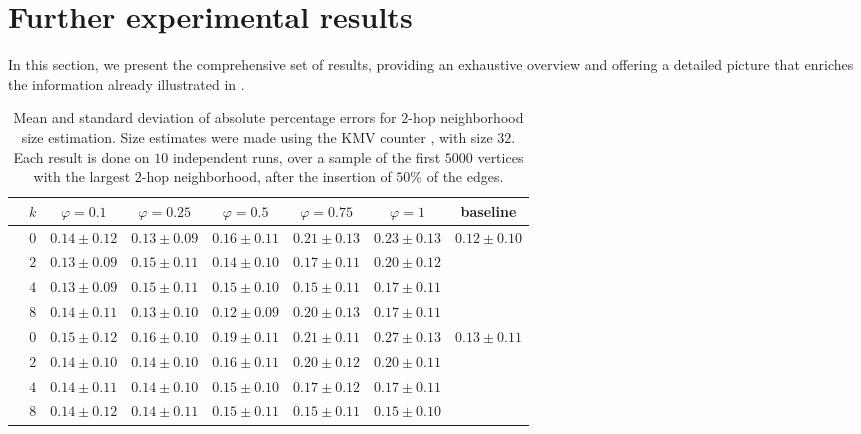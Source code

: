 \section{Further experimental results}\label{apx:experiments}

In this section, we present the comprehensive set of results, providing an exhaustive overview and offering a detailed picture that enriches the information already illustrated in .

\begin{table*}[ht]
    \centering
    \caption{Mean and standard deviation of absolute percentage errors for $2$-hop neighborhood size estimation. Size estimates were made using the KMV counter \cite{trevisan/646978.711822}, with size $32$.
    Each result is done on $10$ independent runs, over a sample of the first $5000$ vertices with the largest $2$-hop neighborhood, after the insertion of $50\%$ of the edges.
    }
    \begin{tabular}{lc|ccccc|c}
    \toprule
        & $k$ & $\varphi = 0.1$ & $\varphi = 0.25$ & $\varphi = 0.5$ & $\varphi = 0.75$ & $\varphi = 1$ & baseline\\
    \midrule

    \parbox[t]{2mm}{}

    & $0$ & $0.14 \pm 0.12$ & $0.13 \pm 0.09$ & $0.16 \pm 0.11$ & $0.21 \pm 0.13$ & $0.23 \pm 0.13$ &  \\
    & $2$ & $0.13 \pm 0.09$ & $0.15 \pm 0.11$ & $0.14 \pm 0.10$ & $0.17 \pm 0.11$ & $0.20 \pm 0.12$ & \\
    & $4$ & $0.13 \pm 0.09$ & $0.15 \pm 0.11$ & $0.15 \pm 0.10$ & $0.15 \pm 0.11$ & $0.17 \pm 0.11$ & \\
    & $8$ & $0.14 \pm 0.11$ & $0.13 \pm 0.10$ & $0.12 \pm 0.09$ & $0.20 \pm 0.13$ & $0.17 \pm 0.11$ & \\

    \midrule[.66pt]

    \parbox[t]{2mm}{}

    & $0$ & $0.15 \pm 0.12$ & $0.16 \pm 0.10$ & $0.19 \pm 0.11$ & $0.21 \pm 0.11$ & $0.27 \pm 0.13$ &  \\
    & $2$ & $0.14 \pm 0.10$ & $0.14 \pm 0.10$ & $0.16 \pm 0.11$ & $0.20 \pm 0.12$ & $0.20 \pm 0.11$ & \\
    & $4$ & $0.14 \pm 0.11$ & $0.14 \pm 0.10$ & $0.15 \pm 0.10$ & $0.17 \pm 0.12$ & $0.17 \pm 0.11$ & \\
    & $8$ & $0.14 \pm 0.12$ & $0.14 \pm 0.11$ & $0.15 \pm 0.11$ & $0.15 \pm 0.11$ & $0.15 \pm 0.10$ & \\


\end{tabular}
\end{table*}
